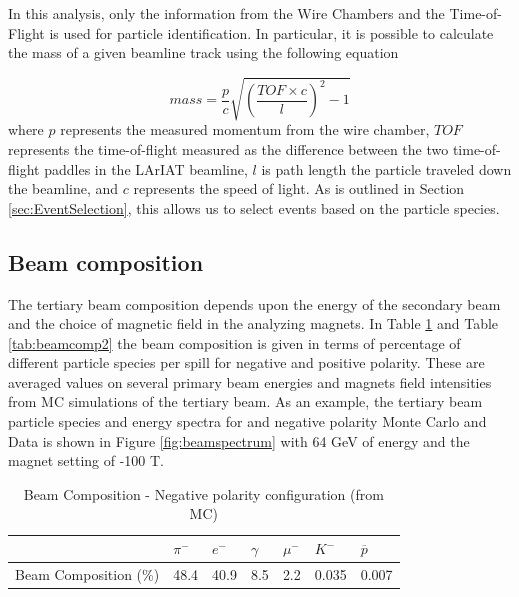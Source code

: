 In this analysis, only the information from the Wire Chambers and the Time-of-Flight is used for particle identification. In particular, it is possible to calculate the mass of a given beamline track using the following equation

\begin{equation}
mass = \frac{p}{c}\sqrt{(\frac{TOF \times c}{l})^2 -1}
\end{equation}
where $p$ represents the measured momentum from the wire chamber, $TOF$ represents the time-of-flight measured as the difference between the two time-of-flight paddles in the LArIAT beamline, $l$ is path length the particle traveled down the beamline, and $c$ represents the speed of light. As is outlined in Section \ref{sec:EventSelection}, this allows us to select events based on the particle species.

\subsection{Beam composition}\label{sec:G4BeamlineMC}
The tertiary beam composition depends upon the energy of the secondary beam and the choice of magnetic field in the analyzing magnets. In Table \ref{tab:beamcomp1} and Table \ref{tab:beamcomp2} the beam composition is given in terms of percentage of different particle species per spill for negative and positive polarity. These are averaged values on several primary beam energies and magnets field intensities from MC simulations of the tertiary beam. As an example, the tertiary beam particle species and energy spectra for and negative polarity Monte Carlo and Data is shown in Figure \ref{fig:beamspectrum}  with 64 GeV of energy and the magnet setting of -100 T.

\begin{table}[ht!]
\centering
\begin{tabular}{|l|l|l|l|l|l|l|}
\hline
                      & $\pi^-$ & $e^-$ & $\gamma$ & $\mu^-$ & $K^-$ & $\overline{p}$ \\ \hline
Beam Composition (\%) &   48.4      &   40.9    &     8.5     &    2.2     &      0.035  &     0.007           \\ \hline
\end{tabular}
\caption{Beam Composition - Negative polarity configuration (from MC)}
\label{tab:beamcomp1}
\end{table}


